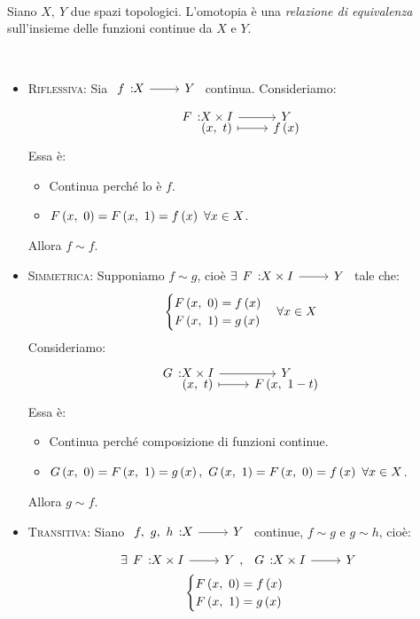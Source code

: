 \begin{lemming}~{}\\
	Siano $X,\ Y$ due spazi topologici. L'omotopia è una \textit{relazione di equivalenza} sull'insieme delle funzioni continue da $X$ e $Y$.
\end{lemming}
\begin{demonstration}~{}
	\begin{itemize}
		\item \textsc{Riflessiva}: Sia $\funz{f}{X}{Y}$ continua. Consideriamo:
		\begin{equation*}
			\funztot{F}{X\times I}{Y}{\left(x,\ t\right)}{f\left(x\right)}
		\end{equation*}
	Essa è:
		\begin{itemize}
			\item Continua perché lo è $f$.
			\item $\mvf{F}{x}{0}=\mvf{F}{x}{1}=f\left(x\right)\ \forall x\in X$.	\end{itemize}
		Allora $f\sim f$.
		\item \textsc{Simmetrica}: Supponiamo $f\sim g$, cioè $\exists \funz{F}{X\times I}{Y}$ tale che:
		\begin{equation*}
			\begin{cases}
				F\left(x,\ 0\right)=f\left(x\right)\\
				F\left(x,\ 1\right)=g\left(x\right)
			\end{cases}
			\forall x\in X
		\end{equation*}
	Consideriamo:
	\begin{equation*}
		\funztot{G}{X\times I}{Y}{\left(x,\ t\right)}{\mvf{F}{x}{1-t}}
	\end{equation*}
	Essa è:
	\begin{itemize}
		\item Continua perché composizione di funzioni continue.
		\item $\mvf{G}{x}{0}=\mvf{F}{x}{1}=g\left(x\right),\ \mvf{G}{x}{1}=\mvf{F}{x}{0}=f\left(x\right)\ \forall x\in X$.
	\end{itemize}
Allora $g\sim f$.
\item \textsc{Transitiva}: Siano $\funz{f,\ g,\ h}{X}{Y}$ continue, $f\sim g$ e $g\sim h$, cioè:
\begin{gather*}
	\exists \funz{F}{X\times I}{Y},\ \funz{G}{X\times I}{Y}\\
	\begin{cases}
		\mvf{F}{x}{0}=f\left(x\right)\\
		\mvf{F}{x}{1}=g\left(x\right)

\end{cases}
\end{gather*}
\end{itemize}
\end{demonstration}
